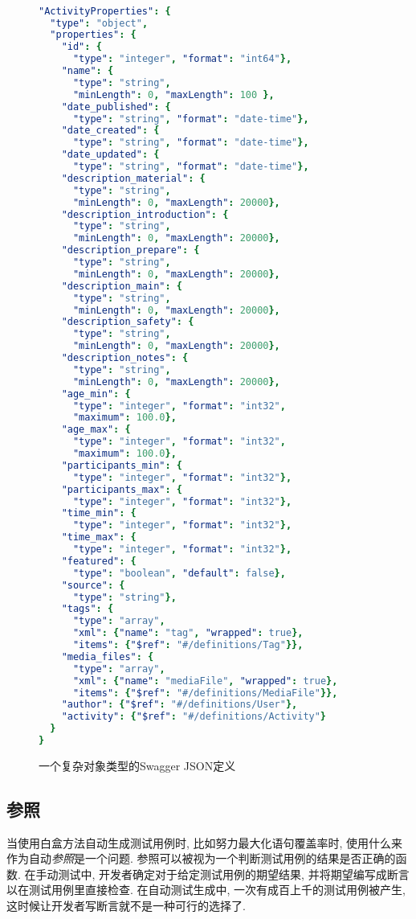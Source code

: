     \begin{figure}
      {
        \tt
        \scriptsize
      \begin{lstlisting}[language=yaml]
"ActivityProperties": { 
  "type": "object", 
  "properties": {
    "id": {
      "type": "integer", "format": "int64"},
    "name": {
      "type": "string",
      "minLength": 0, "maxLength": 100 },
    "date_published": { 
      "type": "string", "format": "date-time"},
    "date_created": { 
      "type": "string", "format": "date-time"},
    "date_updated": { 
      "type": "string", "format": "date-time"},
    "description_material": {
      "type": "string",
      "minLength": 0, "maxLength": 20000},
    "description_introduction": {
      "type": "string",
      "minLength": 0, "maxLength": 20000},
    "description_prepare": {
      "type": "string",
      "minLength": 0, "maxLength": 20000},
    "description_main": {
      "type": "string",
      "minLength": 0, "maxLength": 20000},
    "description_safety": {
      "type": "string",
      "minLength": 0, "maxLength": 20000},
    "description_notes": {
      "type": "string",
      "minLength": 0, "maxLength": 20000},
    "age_min": {
      "type": "integer", "format": "int32",
      "maximum": 100.0},
    "age_max": {
      "type": "integer", "format": "int32",
      "maximum": 100.0},
    "participants_min": {
      "type": "integer", "format": "int32"},
    "participants_max": { 
      "type": "integer", "format": "int32"},
    "time_min": { 
      "type": "integer", "format": "int32"},
    "time_max": { 
      "type": "integer", "format": "int32"},
    "featured": { 
      "type": "boolean", "default": false},
    "source": {
      "type": "string"},
    "tags": {
      "type": "array",
      "xml": {"name": "tag", "wrapped": true}, 
      "items": {"$ref": "#/definitions/Tag"}},
    "media_files": {
      "type": "array",
      "xml": {"name": "mediaFile", "wrapped": true}, 
      "items": {"$ref": "#/definitions/MediaFile"}},
    "author": {"$ref": "#/definitions/User"}, 
    "activity": {"$ref": "#/definitions/Activity"}
  }
}
        \end{lstlisting}
        }
        \caption[]{一个复杂对象类型的Swagger JSON定义}
        \label{fig2}
    \end{figure}
    
    \subsection{参照}
    当使用白盒方法自动生成测试用例时, 比如努力最大化语句覆盖率时, 使用什么来作为自动\textit{参照}是一个问题. 参照可以被视为一个判断测试用例的结果是否正确的函数. 在手动测试中, 开发者确定对于给定测试用例的期望结果, 并将期望编写成断言以在测试用例里直接检查. 在自动测试生成中, 一次有成百上千的测试用例被产生, 这时候让开发者写断言就不是一种可行的选择了. 
        
